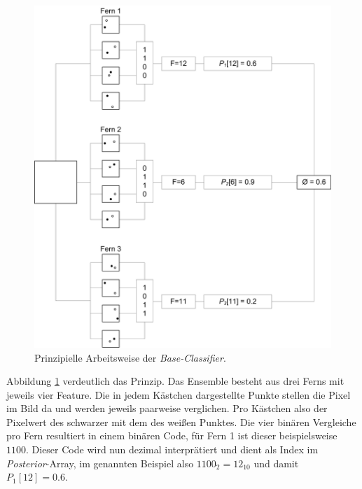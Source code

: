 	\begin{figure}[H]
	\begin{centering}
	\includegraphics[scale=0.5]{../pictures/EnsembleBeispiel.jpg}
	\par\end{centering}
	\caption{Prinzipielle Arbeitsweise der \textit{Base-Classifier}.}
	\label{EnCl}
	\end{figure}

	Abbildung \ref{EnCl} verdeutlich das Prinzip. Das Ensemble besteht aus drei Ferns mit jeweils vier Feature. Die in jedem Kästchen dargestellte Punkte stellen die Pixel im Bild da und werden jeweils paarweise verglichen. Pro Kästchen also der Pixelwert des schwarzer mit dem des weißen Punktes. Die vier binären Vergleiche pro Fern resultiert in einem binären Code, für Fern 1 ist dieser beispielsweise $1100$. Dieser Code wird nun dezimal interprätiert und dient als Index im\textit{ Posterior}-Array, im genannten Beispiel also $1100_{2}=12_{10}$ und damit $P_{1}[12]=0.6$.


